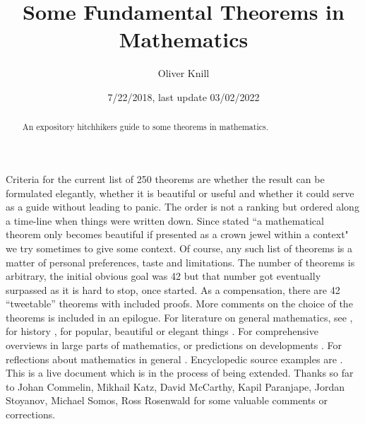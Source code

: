 \documentclass[12pt]{amsart}
\title{Some Fundamental Theorems in Mathematics}
\author{Oliver Knill}
\date{7/22/2018, last update 03/02/2022}
\newcounter{example}    \def\example#1{ \item \fontsize{12}{15} \selectfont #1 \fontsize{12}{15} \selectfont }
\begin{document}
\maketitle

\begin{abstract}
An expository hitchhikers guide to some theorems in mathematics. 
\end{abstract} 

Criteria for the current list of 250 theorems are whether the result 
can be formulated elegantly, whether it is beautiful or useful and whether
it could serve as a guide \cite{HitchhikersGuide} without leading to panic.
The order is not a ranking but ordered along a time-line when things were written
down. Since \cite{RotaBeauty} stated
``a mathematical theorem only becomes beautiful if presented as a crown jewel 
within a context" we try sometimes to give some context. 
Of course, any such list of theorems is a matter of personal preferences, taste
and limitations. The number of theorems is arbitrary, the initial obvious goal was 42 
but that number got eventually surpassed as it is hard to stop, once started. 
As a compensation, there are 42 ``tweetable'' theorems with included proofs. 
More comments on the choice of the theorems is included in an epilogue.
For literature on general mathematics, see 
\cite{princetonguide,princetonguideapplied,atiyah2000,Garrity,Gowers2002,Stillwell2016,KrantzPark,ConwayCapstone},
for history \cite{Fink1890,Struik1948,Klein1979,BourbakiHistory,Bell,Eves,Kline2,Katz2007,Wussing,Ceruzzi,
Stillwell2010,boyer,guinness,Jackson2012}, for popular, beautiful or elegant things 
\cite{AigZie,Mathbook,Elwes,Dunham,AlsinaNelson,Wells1,Wells2,BehrendsFuenfMinutenMath,EricksonBeautiful,
30SecondMath,MathInMinutes,MacCormick, 17Equations,Henshaw,Elwes,100theorems,CochraneEquations,Crilly50,Cochrane,Neunhauserer,BogdanGrechuk,
MathBook2019}.
For comprehensive overviews in large parts of mathematics, 
\cite{BourbakiElements,DieudonnePanorama,Dieudonne1,BergerPanorama,Simon2017} or predictions on developments 
\cite{MathematicsUnlimited}. For reflections about mathematics in general
\cite{CourantRobbins,RobertoMartinez2018,BellDevelopment,Hersh1997,Livio2009,Byers,RuelleBrain}.
Encyclopedic source examples are
\cite{EDM,Zwillinger,CRCEncyclopedia,CavagnaroHaight,KrantzDictionary,Downing,FrancoiseNaberTsun,
KrantzComprehensive,OxfordDictionary,Tanton}. \\

This is a live document which is in the process of being extended. Thanks so far to 
Johan Commelin, Mikhail Katz, David McCarthy, Kapil Paranjape, 
Jordan Stoyanov, Michael Somos, Ross Rosenwald for some valuable comments or 
corrections. 
\end{document}
